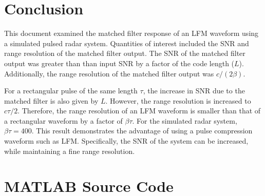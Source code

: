 \documentclass[conference]{IEEEtran}
\begin{document}
\section{Conclusion}
This document examined the matched filter response of an LFM waveform using a simulated pulsed radar system. Quantities of interest included the SNR and range resolution of the matched filter output. The SNR of the matched filter output was greater than than input SNR by a factor of the code length ($L$). Additionally, the range resolution of the matched filter output was $c/(2\beta)$.
\par
For a rectangular pulse of the same length $\tau$, the increase in SNR due to the matched filter is also given by $L$. However, the range resolution is increased to $c\tau/2$. Therefore, the range resolution of an LFM waveform is smaller than that of a rectangular waveform by a factor of $\beta\tau$. For the simulated radar system, $\beta\tau = 400$. This result demonstrates the advantage of using a pulse compression waveform such as LFM. Specifically, the SNR of the system can be increased, while maintaining a fine range resolution.

\onecolumn
\pagebreak
\appendices
\section{MATLAB Source Code}
\label{matlab_code}
\lstset{style=Matlab-editor}

\raggedbottom
\pagebreak

\raggedbottom
\end{document}
